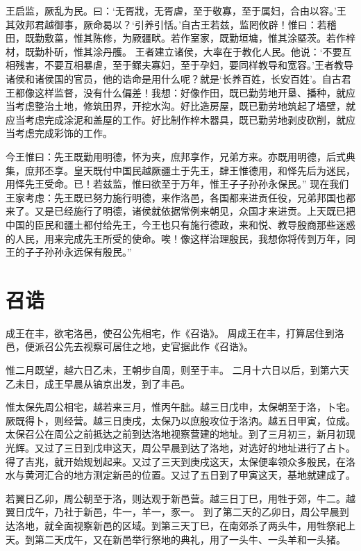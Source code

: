 \documentclass[a4paper,12pt,UTF8,twoside]{ctexbook}
\begin{document}
王启监，厥乱为民。曰：‘无胥戕，无胥虐，至于敬寡，至于属妇，合由以容。’王其效邦君越御事，厥命曷以？‘引养引恬。’自古王若兹，监罔攸辟！惟曰：若稽田，既勤敷菑，惟其陈修，为厥疆畎。若作室家，既勤垣墉，惟其涂塈茨。若作梓材，既勤朴斫，惟其涂丹雘。
王者建立诸侯，大率在于教化人民。他说：‘不要互相残害，不要互相暴虐，至于鳏夫寡妇，至于孕妇，要同样教导和宽容。’王者教导诸侯和诸侯国的官员，他的诰命是用什么呢？就是‘长养百姓，长安百姓’。自古君王都像这样监督，没有什么偏差！我想：好像作田，既已勤劳地开垦、播种，就应当考虑整治土地，修筑田界，开挖水沟。好比造房屋，既已勤劳地筑起了墙壁，就应当考虑完成涂泥和盖屋的工作。好比制作梓木器具，既已勤劳地剥皮砍削，就应当考虑完成彩饰的工作。

今王惟曰：先王既勤用明德，怀为夹，庶邦享作，兄弟方来。亦既用明德，后式典集，庶邦丕享。皇天既付中国民越厥疆土于先王，肆王惟德用，和怿先后为迷民，用怿先王受命。已！若兹监，惟曰欲至于万年，惟王子子孙孙永保民。”
现在我们王家考虑：先王既已努力施行明德，来作洛邑，各国都来进贡任役，兄弟邦国也都来了。又是已经施行了明德，诸侯就依据常例来朝见，众国才来进贡。上天既已把中国的臣民和疆土都付给先王，今王也只有施行德政，来和悦、教导殷商那些迷惑的人民，用来完成先王所受的使命。唉！像这样治理殷民，我想你将传到万年，同王的子子孙孙永远保有殷民。”

\chapter{召诰}

成王在丰，欲宅洛邑，使召公先相宅，作《召诰》。
周成王在丰，打算居住到洛邑，便派召公先去视察可居住之地，史官据此作《召诰》。

惟二月既望，越六日乙未，王朝步自周，则至于丰。
二月十六日以后，到第六天乙未日，成王早晨从镐京出发，到了丰邑。

惟太保先周公相宅，越若来三月，惟丙午朏。越三日戊申，太保朝至于洛，卜宅。厥既得卜，则经营。越三日庚戌，太保乃以庶殷攻位于洛汭。越五日甲寅，位成。
太保召公在周公之前抵达之前到达洛地视察营建的地址。到了三月初三，新月初现光辉。又过了三日到戊申这天，周公早晨到达了洛地，对选好的地址进行了占卜。得了吉兆，就开始规划起来。又过了三天到庚戌这天，太保便率领众多殷民，在洛水与黄河汇合的地方测定新邑的位置。又过了五日到了甲寅这天，基地就建成了。

若翼日乙卯，周公朝至于洛，则达观于新邑营。越三日丁巳，用牲于郊，牛二。越翼日戊午，乃社于新邑，牛一，羊一，豕一。
到了第二天的乙卯日，周公早晨到达洛地，就全面视察新邑的区域。到第三天丁巳，在南郊杀了两头牛，用牲祭祀上天。到第二天戊午，又在新邑举行祭地的典礼，用了一头牛、一头羊和一头猪。
\end{document}
